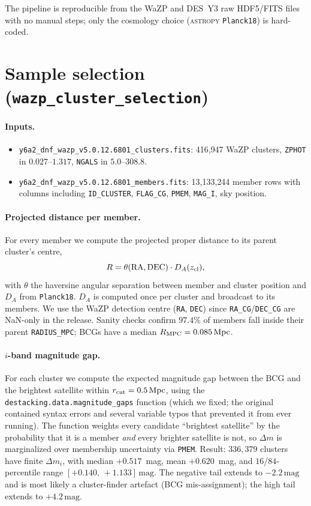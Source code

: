 \documentclass[11pt,a4paper]{article}
\newcommand{\dm}{\Delta m}
\newcommand{\Mpc}{\,\mathrm{Mpc}}
\begin{document}
The pipeline is reproducible from the WaZP and DES~Y3 raw HDF5/FITS files
with no manual steps; only the cosmology choice (\textsc{astropy}
\verb|Planck18|) is hard-coded.

\section{Sample selection (\texttt{wazp\_cluster\_selection})}
\label{sec:selection}

\paragraph{Inputs.}
\begin{itemize}
\item \verb|y6a2_dnf_wazp_v5.0.12.6801_clusters.fits|: 416{,}947 WaZP clusters,
\verb|ZPHOT| in $0.027$--$1.317$, \verb|NGALS| in $5.0$--$308.8$.
\item \verb|y6a2_dnf_wazp_v5.0.12.6801_members.fits|: 13{,}133{,}244 member rows
with columns including \verb|ID_CLUSTER|, \verb|FLAG_CG|, \verb|PMEM|,
\verb|MAG_I|, sky position.
\end{itemize}

\paragraph{Projected distance per member.}
For every member we compute the projected proper distance to its parent cluster's
centre,
\[
  R = \theta(\mathrm{RA},\mathrm{DEC}) \cdot D_A(z_{\rm cl}),
\]
with $\theta$ the haversine angular separation between member and cluster
position and $D_A$ from \verb|Planck18|. $D_A$ is computed once per cluster
and broadcast to its members. We use the WaZP detection centre
(\verb|RA|, \verb|DEC|) since \verb|RA_CG|/\verb|DEC_CG| are NaN-only in the
release. Sanity checks confirm $97.4\%$ of members fall inside their parent
\verb|RADIUS_MPC|; BCGs have a median $R_{\rm MPC}=0.085\Mpc$.

\paragraph{$i$-band magnitude gap.}
For each cluster we compute the expected magnitude gap between the BCG and
the brightest satellite within $r_{\rm cut}=0.5\Mpc$, using the
\verb|destacking.data.magnitude_gaps| function (which we fixed; the original
contained syntax errors and several variable typos that prevented it from
ever running). The function weights every candidate ``brightest satellite''
by the probability that it is a member \emph{and} every brighter satellite is
not, so $\dm$ is marginalized over membership uncertainty via \verb|PMEM|.
Result: $336{,}379$ clusters have finite $\dm_i$, with median $+0.517$~mag,
mean $+0.620$~mag, and $16$/$84$-percentile range
$[+0.140,\,+1.133]\,\mathrm{mag}$. The negative tail extends to
$-2.2\,\mathrm{mag}$ and is most likely a cluster-finder artefact
(BCG mis-assignment); the high tail extends to $+4.2\,\mathrm{mag}$.
\end{document}

